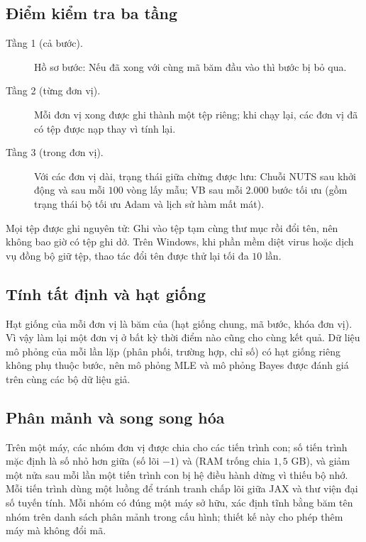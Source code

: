 \documentclass[12pt,a4paper]{article}
\theoremstyle{remark}
\begin{document}
\subsection{Điểm kiểm tra ba tầng}

\begin{description}
\item[Tầng 1 (cả bước).] Hồ sơ bước: Nếu đã xong với cùng mã băm đầu vào thì bước bị bỏ qua.
\item[Tầng 2 (từng đơn vị).] Mỗi đơn vị xong được ghi thành một tệp riêng; khi chạy lại, các đơn vị đã có tệp được nạp thay vì tính lại.
\item[Tầng 3 (trong đơn vị).] Với các đơn vị dài, trạng thái giữa chừng được lưu: Chuỗi NUTS sau khởi động và sau mỗi $100$ vòng lấy mẫu; VB sau mỗi $2.000$ bước tối ưu (gồm trạng thái bộ tối ưu Adam và lịch sử hàm mất mát).
\end{description}

Mọi tệp được ghi nguyên tử: Ghi vào tệp tạm cùng thư mục rồi đổi tên, nên không bao giờ có tệp ghi dở. Trên Windows, khi phần mềm diệt virus hoặc dịch vụ đồng bộ giữ tệp, thao tác đổi tên được thử lại tối đa $10$ lần.

\subsection{Tính tất định và hạt giống}

Hạt giống của mỗi đơn vị là băm của (hạt giống chung, mã bước, khóa đơn vị). Vì vậy làm lại một đơn vị ở bất kỳ thời điểm nào cũng cho cùng kết quả. Dữ liệu mô phỏng của mỗi lần lặp (phân phối, trường hợp, chỉ số) có hạt giống riêng không phụ thuộc bước, nên mô phỏng MLE và mô phỏng Bayes được đánh giá trên cùng các bộ dữ liệu giả.

\subsection{Phân mảnh và song song hóa}

Trên một máy, các nhóm đơn vị được chia cho các tiến trình con; số tiến trình mặc định là số nhỏ hơn giữa (số lõi $-1$) và (RAM trống chia $1{,}5$ GB), và giảm một nửa sau mỗi lần một tiến trình con bị hệ điều hành dừng vì thiếu bộ nhớ. Mỗi tiến trình dùng một luồng để tránh tranh chấp lõi giữa JAX và thư viện đại số tuyến tính. Mỗi nhóm có đúng một máy sở hữu, xác định tĩnh bằng băm tên nhóm trên danh sách phân mảnh trong cấu hình; thiết kế này cho phép thêm máy mà không đổi mã.
\end{document}
